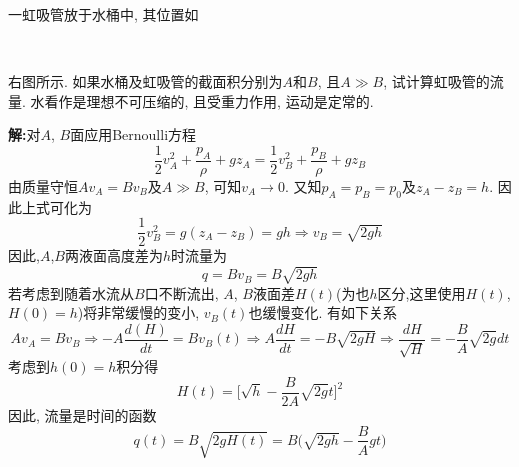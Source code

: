 \begin{problem}[问题5.1]一虹吸管放于水桶中, 其位置如
\vspace{-2em}
\begin{multicols}{2}
~

右图所示. 如果水桶及虹吸管的截面积分别为$A$和$B$, 且$A\gg B$, 试计算虹吸管的流量. 水看作是理想不可压缩的, 且受重力作用, 运动是定常的.
\begin{center}

\end{center}
\end{multicols}
\end{problem}

\begin{solution}
\textbf{解:}对$A$, $B$面应用Bernoulli方程
\[
\frac{1}{2}v_A^2 + \frac{p_A}{\rho} + gz_A =
\frac{1}{2}v_B^2 + \frac{p_B}{\rho} + gz_B
\]
由质量守恒$Av_A = Bv_B$及$A\gg B$, 可知$v_A\rightarrow 0$. 又知$p_A = p_B = p_0$及$z_A-z_B = h$. 因此上式可化为
\[
\frac{1}{2}v_B^2 = g(z_A-z_B) = gh \Longrightarrow  v_B = \sqrt{2gh}
\]
因此,$A$,$B$两液面高度差为$h$时流量为
\[
q = Bv_B = B\sqrt{2gh}
\]
若考虑到随着水流从$B$口不断流出, $A$, $B$液面差$H(t)$(为也$h$区分,这里使用$H(t)$, $H(0) = h$)将非常缓慢的变小, $v_B(t)$也缓慢变化. 有如下关系
\[
Av_A = Bv_B\Longrightarrow -A\frac{d(H)}{dt} = Bv_B(t) \Longrightarrow A\frac{dH}{dt} = -B\sqrt{2gH}
\Longrightarrow \frac{dH}{\sqrt{H}} = -\frac{B}{A}\sqrt{2g}dt
\]
考虑到$h(0)=h$积分得
\[
H(t) = \Big[\sqrt{h}-\frac{B}{2A}\sqrt{2g}t\Big]^2
\]
因此, 流量是时间的函数
\[
q(t) = B\sqrt{2gH(t)} = B\Big(\sqrt{2gh}-\frac{B}{A}gt\Big)
\]

\end{solution} 
